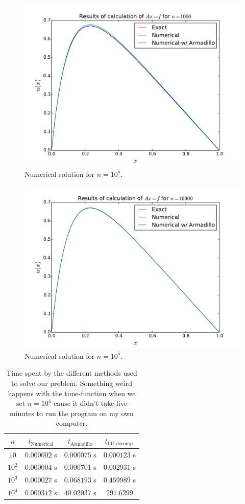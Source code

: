 \documentclass[english, 11pt]{article}
\begin{document}
\begin{figure}[H]
    \centering
    \includegraphics[width = .9\textwidth]{d_n_1000.pdf}
    \caption{Numerical solution for $n=10^5$.}
    \label{fig:sol103}
\end{figure}

\begin{figure}[H]
    \centering
    \includegraphics[width = .9\textwidth]{d_n_10000.pdf}
    \caption{Numerical solution for $n=10^5$.}
    \label{fig:sol104}
\end{figure}

\begin{table}[H]
  \centering
  \begin{tabular}{ c c c c }
    \toprule
    $n$ & $t_{\text{Numerical}}$ & $t_{\text{Armadillo}}$ & $t_{\text{LU decomp.}}$ \\
    \midrule
	$10$   & $0.000002$ s & $0.000075$ s & $0.000123$ s \\
	$10^2$ & $0.000004$ s & $0.000701$ s & $0.002931$ s \\
	$10^3$ & $0.000027$ s & $0.068193$ s & $0.459989$ s \\
	$10^4$ & $0.000312$ s & $40.02037$ s & $297.6299$ \\
    \bottomrule
  \end{tabular}
  \caption{Time spent by the different methods used to solve our problem. Something weird happens with the time-function when we set $n=10^4$ cause it didn't take five minutes to run the program on my own computer.}
  \label{tab:time}
\end{table}
\end{document}

